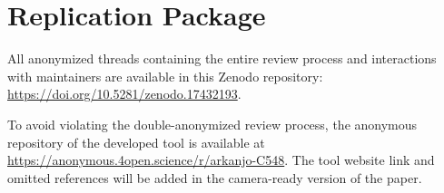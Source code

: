 \documentclass[sigconf]{acmart}
\begin{document}
\section*{Replication Package}

All anonymized threads containing the entire review process and interactions with maintainers are available in this Zenodo repository: \href{https://doi.org/10.5281/zenodo.17432193}{https://doi.org/10.5281/zenodo.17432193}.

To avoid violating the double-anonymized review process, the anonymous repository of the developed tool is available at \url{https://anonymous.4open.science/r/arkanjo-C548}. The tool website link and omitted references will be added in the camera-ready version of the paper.



\end{document}
